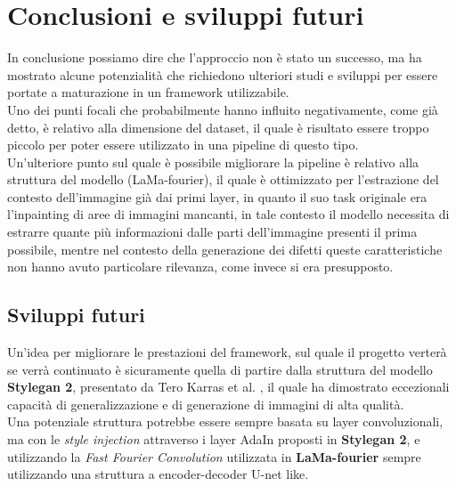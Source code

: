 \chapter{Conclusioni e sviluppi futuri}
In conclusione possiamo dire che l'approccio non è stato un successo, ma ha mostrato alcune potenzialità che richiedono ulteriori studi e sviluppi per
essere portate a maturazione in un framework utilizzabile.\\
Uno dei punti focali che probabilmente hanno influito negativamente, come già detto, è relativo alla dimensione del dataset, il quale è risultato essere
troppo piccolo per poter essere utilizzato in una pipeline di questo tipo.\\
Un'ulteriore punto sul quale è possibile migliorare la pipeline è relativo alla struttura del modello (LaMa-fourier), il quale è ottimizzato per l'estrazione
del contesto dell'immagine già dai primi layer, in quanto il suo task originale era l'inpainting di aree di immagini mancanti, in tale contesto il modello
necessita di estrarre quante più informazioni dalle parti dell'immagine presenti il prima possibile, mentre nel contesto
della generazione dei difetti queste caratteristiche non hanno avuto particolare rilevanza, come invece si era presupposto.

\section{Sviluppi futuri}
Un'idea per migliorare le prestazioni del framework, sul quale il progetto verterà se verrà continuato è sicuramente quella di partire dalla struttura del
modello \textbf{Stylegan 2}, presentato da Tero Karras et al. \cite{karras2020analyzing}, il quale ha dimostrato eccezionali capacità di generalizzazione
e di generazione di immagini di alta qualità.\\
Una potenziale struttura potrebbe essere sempre basata su layer convoluzionali, ma con le \textit{style injection} attraverso i layer AdaIn proposti in \textbf{Stylegan 2},
e utilizzando la \textit{Fast Fourier Convolution} utilizzata in \textbf{LaMa-fourier} sempre utilizzando una struttura a encoder-decoder U-net like.
